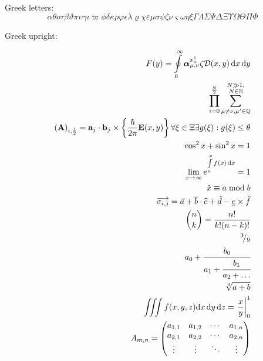 \documentclass[11pt, oneside]{article}   	%
\begin{document}
Greek letters:
\begin{equation}
 \alpha \theta o \tau \beta \vartheta \pi \upsilon \gamma \iota \varpi \phi \delta \kappa \rho \varphi \epsilon \lambda \varrho \chi \varepsilon \mu \sigma \psi \zeta \nu \varsigma \omega \eta \xi \Gamma \Lambda \Sigma \Psi \Delta \Xi \Upsilon \Omega \Theta \Pi \Phi
\end{equation}

Greek upright:
\begin{equation}
\end{equation}


\begin{eqnarray}
F(y) = \oint\limits_0^\infty\boldsymbol{\alpha}^{x^1_a}_{\mu, \nu} \zeta \mathcal{D}(x,y)\, \mathrm{d}x\, \mathrm{d}y\\
\prod_{i=0}^{\frac{N}{2}} \sum_{\mu\neq\nu, \mu'\in\mathbb{Q}}^{\substack{N\gg1,\\ N\in\mathbb{N}}} \\
\left(\mathbf{A}\right)_{i, \frac12} = \mathbf{a}_j\cdot\mathbf{b}_j\times \left\{\frac{\hbar}{2\pi} \mathbf{E}(x,y)\right\}
\forall \xi \in \Xi \exists g(\xi): g(\xi) \leq \theta \\
\cos^2{x} + \sin^2{x} = 1 \\
\lim_{x\to \infty} e^{\int\limits_0^x f(x)\, \mathrm{d}x} = 1 \\
\hat{x} \equiv a \bmod b \\
\overrightarrow{\sigma_{i,j}} = \vec{a} +  \overline{b} \cdot \widehat{c} + \tilde{d} - \underline{e} \times \ddot{f}\\
\binom{n}{k} = \frac{n!}{k!(n-k)!} \\
^3\!/_9 \\ %
a_0 + \cfrac{b_0}{a_1 + \cfrac{b_1}{a_2 + \dots}} \\ %
\sqrt[3]{a + b} \\
\iiint{f(x,y,z)} \mathrm{d}x\, \mathrm{d}y\, \mathrm{d}z = \left.\frac{x}{y}\right|_0^1 \\
A_{m,n} =
 \begin{pmatrix}
  a_{1,1} & a_{1,2} & \cdots & a_{1,n} \\
  a_{2,1} & a_{2,2} & \cdots & a_{2,n} \\
  \vdots  & \vdots  & \ddots & \vdots  \\

\end{pmatrix}
\end{eqnarray}
\end{document}
